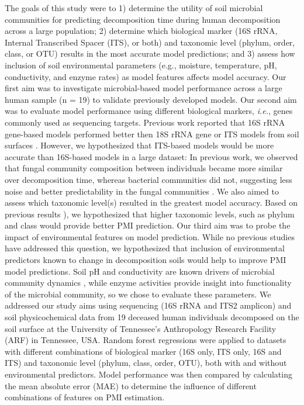 \documentclass[
  10pt,
  letterpaper,
]{article}
\begin{document}
The goals of this study were to 1) determine the utility of soil
microbial communities for predicting decomposition time during human
decomposition across a large population; 2) determine which biological
marker (16S rRNA, Internal Transcribed Spacer (ITS), or both) and
taxonomic level (phylum, order, class, or OTU) results in the most
accurate model predictions; and 3) assess how inclusion of soil
environmental parameters (e.g., moisture, temperature, pH, conductivity,
and enzyme rates) as model features affects model accuracy. Our first
aim was to investigate microbial-based model performance across a large
human sample (n = 19) to validate previously developed models. Our
second aim was to evaluate model performance using different biological
markers, \emph{i.e.}, genes commonly used as sequencing targets.
Previous work reported that 16S rRNA gene-based models performed better
then 18S rRNA gene or ITS models from soil surfaces
\citep{belk_microbiome_2018, burcham_conserved_2024}. However, we
hypothesized that ITS-based models would be more accurate than 16S-based
models in a large dataset: In previous work, we observed that fungal
community composition between individuals became more similar over
decomposition time, whereas bacterial communities did not, suggesting
less noise and better predictability in the fungal communities
\citep{mason_body_2022}. We also aimed to assess which taxonomic
level(s) resulted in the greatest model accuracy. Based on previous
results \citep{belk_microbiome_2018, mason_body_2022}), we hypothesized
that higher taxonomic levels, such as phylum and class would provide
better PMI prediction. Our third aim was to probe the impact of
environmental features on model prediction. While no previous studies
have addressed this question, we hypothesized that inclusion of
environmental predictors known to change in decomposition soils would
help to improve PMI model predictions. Soil pH and conductivity are
known drivers of microbial community dynamics
\citep{lauber_pyrosequencing-based_2009, rath_linking_2019}, while
enzyme activities provide insight into functionality of the microbial
community, so we chose to evaluate these parameters. We addressed our
study aims using sequencing (16S rRNA and ITS2 amplicon) and soil
physicochemical data from 19 deceased human individuals
\citep{mason_body_2022} decomposed on the soil surface at the University
of Tennessee's Anthropology Research Facility (ARF) in Tennessee, USA.
Random forest regressions were applied to datasets with different
combinations of biological marker (16S only, ITS only, 16S and ITS) and
taxonomic level (phylum, class, order, OTU), both with and without
environmental predictors. Model performance was then compared by
calculating the mean absolute error (MAE) to determine the influence of
different combinations of features on PMI estimation.
\end{document}
